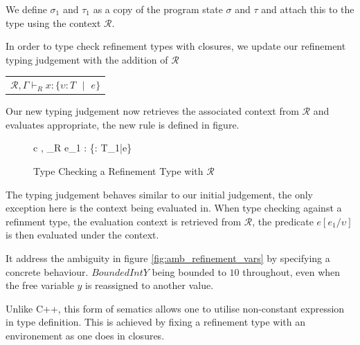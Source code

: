 \documentclass[a4paper,12pt]{report}
\begin{document}
\par
We define $\sigma_1$ and $\tau_1$ as a copy of the program state $\sigma$ and 
$\tau$ and attach this to the type using the context $\mathcal{R}$. 

\par
In order to type check refinement types with closures, we update our refinement 
typing judgement with the addition of $\mathcal{R}$

\begin{center}
  \begin{tabular} {c}
    $\mathcal{R},\Gamma \vdash_{R} x : \{\upsilon : T\text{ }|\text{ }e\}$
  \end{tabular}
\end{center}

\par
Our new typing judgement now retrieves the associated context from $\mathcal{R}$ 
and evaluates appropriate, the new rule is defined in figure. 

\begin{figure}[H]
  \begin{center}
    \begin{tabular}{c}
      {, \Gamma \vdash_{R} e_1 : \{\upsilon : T_1\text{ }|\text{ }e\}} 
    \end{tabular}
  \end{center}
  \caption{Type Checking a Refinement Type with $\mathcal{R}$}
\end{figure}


\par
The typing judgement behaves similar to our initial judgement, the only 
exception here is the context being evaluated in. When type checking against a 
refinment type, the evaluation context is retrieved from $\mathcal{R}$, the 
predicate $e[e_1/\upsilon]$ is then evaluated under the context.

\par
It address the ambiguity in figure \ref{fig:amb_refinement_vars} by specifying 
a concrete behaviour. $BoundedIntY$ being bounded to $10$ throughout, even when 
the free variable $y$ is reassigned to another value.
 
\par
Unlike C++, this form of sematics allows one to utilise non-constant expression 
in type definition. This is achieved by fixing a refinement type with an 
environement as one does in closures. 
 
\end{document}
